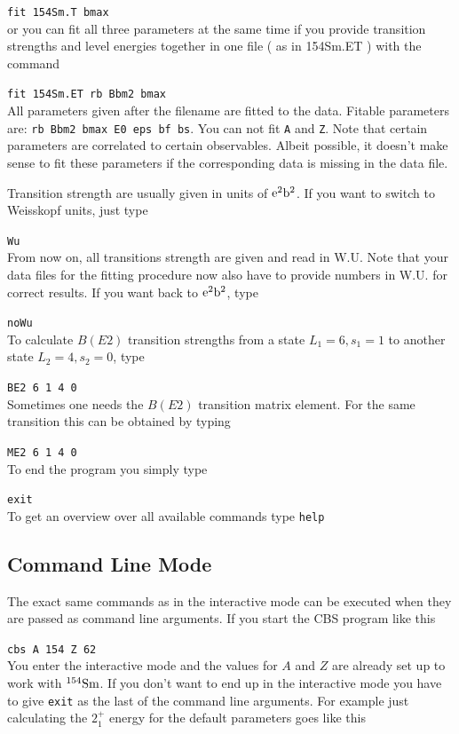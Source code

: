 \documentclass[10pt,a4paper]{article}
\begin{document}
\verb!fit 154Sm.T bmax! \\
or you can fit all three parameters at the same time if you provide transition strengths and level energies together in one file ( as in 154Sm.ET ) with the command 

\verb!fit 154Sm.ET rb Bbm2 bmax! \\
All parameters given after the filename are fitted to the data. Fitable parameters are: \verb!rb Bbm2 bmax E0 eps bf bs!. You can not fit \verb!A! and \verb!Z!. Note that certain parameters are correlated to certain observables. Albeit possible, it doesn't make sense to fit these parameters if the corresponding data is missing in the data file.

Transition strength are usually given in units of ${\rm e}^2 {\rm b}^2$. If you want to switch to Weisskopf units, just type

\verb!Wu! \\
From now on, all transitions strength are given and read in W.U. Note that your data files for the fitting procedure now also have to provide numbers in W.U. for correct results. If you want back to ${\rm e}^2 {\rm b}^2$, type

\verb!noWu! \\
To calculate $B(E2)$ transition strengths from a state $L_1=6, s_1=1$ to another state $L_2=4, s_2=0$, type

\verb!BE2 6 1 4 0! \\
Sometimes one needs the $B(E2)$ transition matrix element. For the same transition this can be obtained by typing 

\verb!ME2 6 1 4 0! \\
To end the program you simply type 

\verb!exit! \\
To get an overview over all available commands type
\verb!help! \\

\subsection{Command Line Mode}
The exact same commands as in the interactive mode can be executed when they are passed as command line arguments. If you start the CBS program like this

\verb!cbs A 154 Z 62! \\
You enter the interactive mode and the values for $A$ and $Z$ are already set up to work with $^{154}{\rm Sm}$. If you don't want to end up in the interactive mode you have to give \verb!exit! as the last of the command line arguments. For example just calculating the $2^{+}_1$ energy for the default parameters goes like this
\end{document}
